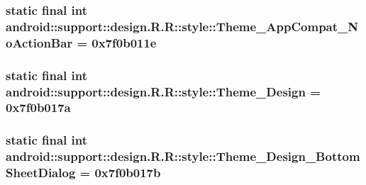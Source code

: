 \hypertarget{classandroid_1_1support_1_1design_1_1_r_1_1style_82afdedc7cbe31bea9faccd94c9ea389}{
\subsubsection[{Theme\_\-AppCompat\_\-NoActionBar}]{\setlength{\rightskip}{0pt plus 5cm}static final int android::support::design.R.R::style::Theme\_\-AppCompat\_\-NoActionBar = 0x7f0b011e}}
\label{classandroid_1_1support_1_1design_1_1_r_1_1style_82afdedc7cbe31bea9faccd94c9ea389}


\hypertarget{classandroid_1_1support_1_1design_1_1_r_1_1style_10b6cb49c97f2ecac31411efa936ad0b}{
\subsubsection[{Theme\_\-Design}]{\setlength{\rightskip}{0pt plus 5cm}static final int android::support::design.R.R::style::Theme\_\-Design = 0x7f0b017a}}
\label{classandroid_1_1support_1_1design_1_1_r_1_1style_10b6cb49c97f2ecac31411efa936ad0b}


\hypertarget{classandroid_1_1support_1_1design_1_1_r_1_1style_902ad5436238bc672ca02c27e5273c6a}{
\subsubsection[{Theme\_\-Design\_\-BottomSheetDialog}]{\setlength{\rightskip}{0pt plus 5cm}static final int android::support::design.R.R::style::Theme\_\-Design\_\-BottomSheetDialog = 0x7f0b017b}}
\label{classandroid_1_1support_1_1design_1_1_r_1_1style_902ad5436238bc672ca02c27e5273c6a}


